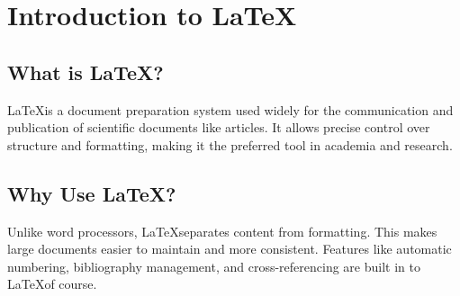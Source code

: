 \chapter{Introduction to \LaTeX}
\section{What is \LaTeX?}
\LaTeX is a document preparation system used widely for the communication and publication of scientific documents like articles. It allows precise control over structure and formatting, making it the preferred tool in academia and research.
\section{Why Use \LaTeX?}
Unlike word processors,
\LaTeX separates content from formatting. This makes large documents easier to maintain and more consistent. Features like automatic numbering, bibliography management, and cross-referencing are built in to
\LaTeX of course.
